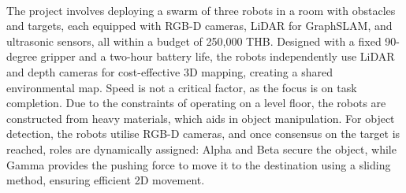 \paragraph*{}
The project involves deploying a swarm of three robots in a room with obstacles and targets, each equipped with RGB-D cameras, LiDAR for GraphSLAM, and ultrasonic sensors, all within a budget of 250,000 THB. Designed with a fixed 90-degree gripper and a two-hour battery life, the robots independently use LiDAR and depth cameras for cost-effective 3D mapping, creating a shared environmental map. Speed is not a critical factor, as the focus is on task completion. Due to the constraints of operating on a level floor, the robots are constructed from heavy materials, which aids in object manipulation. For object detection, the robots utilise RGB-D cameras, and once consensus on the target is reached, roles are dynamically assigned: Alpha and Beta secure the object, while Gamma provides the pushing force to move it to the destination using a sliding method, ensuring efficient 2D movement.
